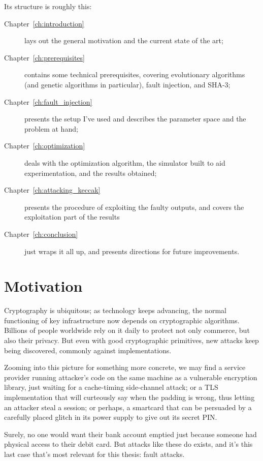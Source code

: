 \documentclass[times, utf8, diplomski]{fer}
\begin{document}
Its structure is roughly this:
\begin{description}
    \item[Chapter~\ref{ch:introduction}] lays out the general motivation and
          the current state of the art;
    \item[Chapter~\ref{ch:prerequisites}] contains some technical prerequisites,
          covering evolutionary algorithms (and genetic algorithms in particular),
          fault injection, and SHA-3;
    \item[Chapter~\ref{ch:fault_injection}] presents the setup I've used and
          describes the parameter space and the problem at hand;
    \item[Chapter~\ref{ch:optimization}] deals with the optimization algorithm,
          the simulator built to aid experimentation, and the results obtained;
    \item[Chapter~\ref{ch:attacking_keccak}] presents the procedure of exploiting
          the faulty outputs, and covers the exploitation part of the results
    \item[Chapter~\ref{ch:conclusion}] just wraps it all up, and presents
          directions for future improvements.
\end{description}


\section{Motivation}
Cryptography is ubiquitous; as technology keeps advancing, the normal functioning
of key infrastructure now depends on cryptographic algorithms. Billions of people
worldwide rely on it daily to protect not only commerce, but also their privacy.
But even with good cryptographic primitives, new attacks keep being discovered,
commonly against implementations.

Zooming into this picture for something more concrete, we may find a service
provider running attacker's code on the same machine as a vulnerable encryption
library, just waiting for a cache-timing side-channel attack; or a TLS
implementation that will curteously say when the padding is wrong, thus letting
an attacker steal a session; or perhaps, a smartcard that can be persuaded by a
carefully placed glitch in its power supply to give out its secret PIN.

Surely, no one would want their bank account emptied just because someone had
physical access to their debit card. But attacks like these do exists, and it's
this last case that's most relevant for this thesis: fault attacks.
\end{document}
